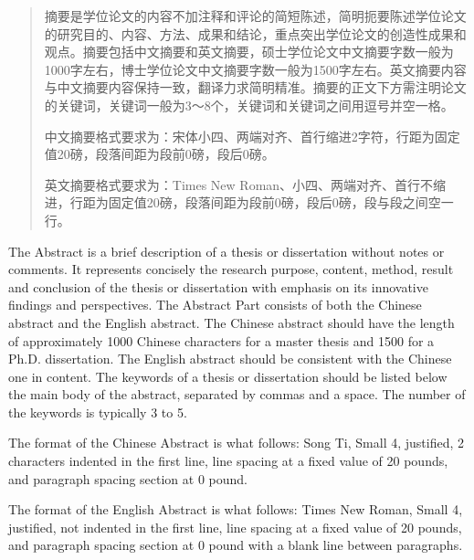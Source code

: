 
\begin{abstract}
摘要是学位论文的内容不加注释和评论的简短陈述，简明扼要陈述学位论文的研究目的、内容、方法、成果和结论，重点突出学位论文的创造性成果和观点。摘要包括中文摘要和英文摘要，硕士学位论文中文摘要字数一般为1000字左右，博士学位论文中文摘要字数一般为1500字左右。英文摘要内容与中文摘要内容保持一致，翻译力求简明精准。摘要的正文下方需注明论文的关键词，关键词一般为3～8个，关键词和关键词之间用逗号并空一格。\par
中文摘要格式要求为：宋体小四、两端对齐、首行缩进2字符，行距为固定值20磅，段落间距为段前0磅，段后0磅。\par
英文摘要格式要求为：Times New Roman、小四、两端对齐、首行不缩进，行距为固定值20磅，段落间距为段前0磅，段后0磅，段与段之间空一行。\par

 \par
\end{abstract}

\begin{englishabstract}
The Abstract is a brief description of a thesis or dissertation without notes or comments. It represents concisely the research purpose, content, method, result and conclusion of the thesis or dissertation with emphasis on its innovative findings and perspectives. The Abstract Part consists of both the Chinese abstract and the English abstract. The Chinese abstract should have the length of approximately 1000 Chinese characters for a master thesis and 1500 for a Ph.D. dissertation. The English abstract should be consistent with the Chinese one in content. The keywords of a thesis or dissertation should be listed below the main body of the abstract, separated by commas and a space. The number of the keywords is typically 3 to 5.
\par\par
The format of the Chinese Abstract is what follows: Song Ti, Small 4, justified, 2 characters indented in the first line, line spacing at a fixed value of 20 pounds, and paragraph spacing section at 0 pound.
\par\par
The format of the English Abstract is what follows: Times New Roman, Small 4, justified, not indented in the first line, line spacing at a fixed value of 20 pounds, and paragraph spacing section at 0 pound with a blank line between paragraphs.
\par
{} \par

\end{englishabstract}

